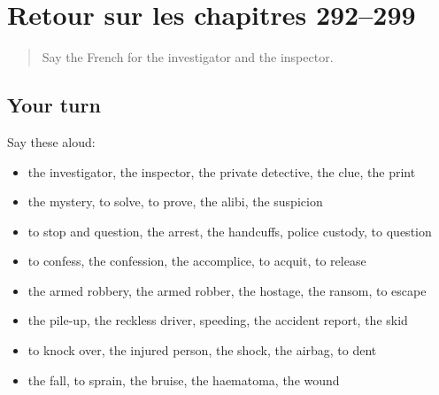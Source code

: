 \section[(dialogue)]{Retour sur les chapitres 292–299}

\label{lesson:FR-R299-revision-292-299}



\begin{quote}
Say the French for the investigator and the inspector.
\end{quote}

\subsection*{Your turn}
Say these aloud:

\begin{itemize}
\raggedright
  \item the investigator, the inspector, the private detective, the clue, the print
  \item the mystery, to solve, to prove, the alibi, the suspicion
  \item to stop and question, the arrest, the handcuffs, police custody, to question
  \item to confess, the confession, the accomplice, to acquit, to release
  \item the armed robbery, the armed robber, the hostage, the ransom, to escape
  \item the pile-up, the reckless driver, speeding, the accident report, the skid
  \item to knock over, the injured person, the shock, the airbag, to dent
  \item the fall, to sprain, the bruise, the haematoma, the wound
\end{itemize}

